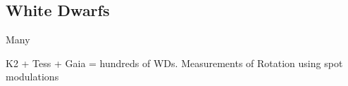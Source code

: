 {\color{red} \subsection{White Dwarfs}}
Many 

K2 + Tess + Gaia = hundreds of WDs. Measurements of Rotation using spot modulations